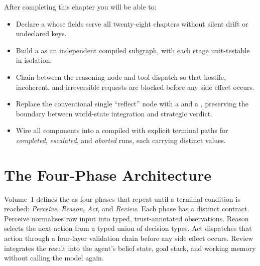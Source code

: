 
\begin{learningbox}
After completing this chapter you will be able to:
\begin{itemize}
  \item Declare a  whose fields serve all
        twenty-eight chapters without silent drift or undeclared keys.
  \item Build a  as an independent
        compiled subgraph, with each stage unit-testable in isolation.
  \item Chain  between the reasoning node
        and tool dispatch so that hostile, incoherent, and irreversible
        requests are blocked before any side effect occurs.
  \item Replace the conventional single ``reflect'' node with a
         and a
        , preserving the
        boundary between world-state integration and strategic verdict.
  \item Wire all components into a compiled  with
        explicit terminal paths for \emph{completed}, \emph{escalated},
        and \emph{aborted} runs, each carrying distinct 
        values.
\end{itemize}
\end{learningbox}

\section{The Four-Phase Architecture}
\label{sec:four-phase}

Volume~1 defines the  as four phases that repeat
until a terminal condition is reached: \emph{Perceive}, \emph{Reason},
\emph{Act}, and \emph{Review}.  Each phase has a distinct contract.
Perceive normalises raw input into typed, trust-annotated observations.
Reason selects the next action from a typed union of decision types.
Act dispatches that action through a four-layer validation chain before
any side effect occurs.  Review integrates the result into the agent's
belief state, goal stack, and working memory without calling the model
again.

